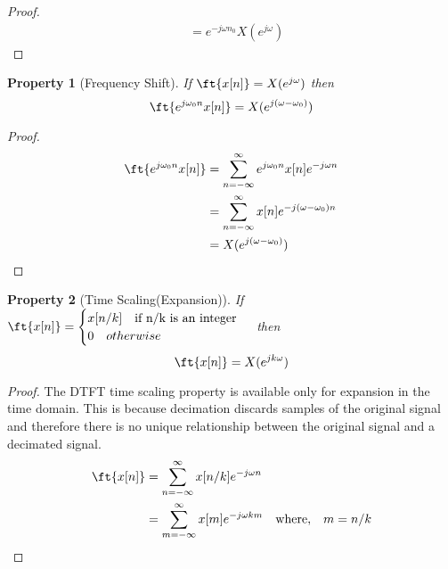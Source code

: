 \documentclass{home_assignment}
\newtheorem{theorem}{Property}
\begin{document}
{\begin{proof}
\begin{equation*}
\begin{aligned}
        &=e^{-j\omega n_0}X(e^{j\omega})
        \end{aligned}
        \end{equation*}
        \end{proof}
        \begin{theorem}[Frequency Shift]
            If $\ft{x[n]}=X(e^{j\omega})$ then
            \begin{equation*}
            \ft{e^{j\omega_0 n} x[n]}=X(e^{j(\omega-\omega_0)})
            \end{equation*}
            \end{theorem}
            \begin{proof}
            \begin{equation*}
            \begin{aligned} 
            \ft{e^{j\omega_0 n} x[n]} &=\sum_{n=-\infty}^{\infty} e^{j\omega_0 n} x[n] e^{-j\omega n} \\
            &=\sum_{n=-\infty}^{\infty} x[n] e^{-j(\omega-\omega_0)n}\\
            &=X(e^{j(\omega-\omega_0)})
            \end{aligned}
            \end{equation*}
            \end{proof}
            \begin{theorem}[Time Scaling(Expansion)]
                If $\ft{x[n]}=\begin{cases}
                    x[n/k] \quad \text{if n/k is an integer}\\
                    0 \quad otherwise
                \end{cases}$ then
                \begin{equation*}
                \ft{x[n]}=X(e^{jk\omega})
                \end{equation*}
                \end{theorem}
                \begin{proof}
                The DTFT time scaling property is available only for expansion in the time domain. This is because decimation discards samples of the original signal and therefore there is no unique relationship between the original signal and a decimated signal.
                \begin{equation*}
                \begin{aligned} 
                \ft{x[n]} &=\sum_{n=-\infty}^{\infty} x[n/k] e^{-j\omega n} \\
                &=\sum_{m=-\infty}^{\infty} x[m] e^{-j\omega km} \quad \text{where,}\quad m=n/k\\

\end{aligned}
\end{equation*}
\end{proof}}
\end{document}
